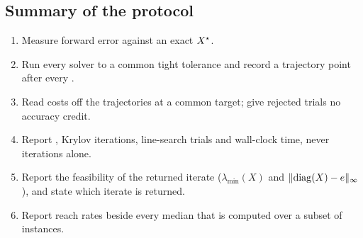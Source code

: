 \subsection{Summary of the protocol}
\begin{enumerate}
  \item Measure forward error against an exact $X^\star$.
  \item Run every solver to a common tight tolerance and record a trajectory
    point after every \EVD.
  \item Read costs off the trajectories at a common target; give rejected
    trials no accuracy credit.
  \item Report \EVDs, Krylov iterations, line-search trials and wall-clock
    time, never iterations alone.
  \item Report the feasibility of the returned iterate
    ($\lambda_{\min}(X)$ and $\lVert \operatorname{diag}(X)-e\rVert_\infty$), and state which
    iterate is returned.
  \item Report reach rates beside every median that is computed over a
    subset of instances.
\end{enumerate}

